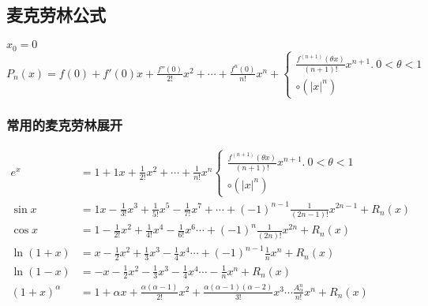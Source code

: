 \subsection{麦克劳林公式}
\begin{center}
    $x_0=0$\\
    $P_n(x)= f(0)+f'(0)x+\frac{f''(0)}{2!}x^2+\cdots+\frac{f^n(0)}{n!}x^n+\begin{cases}
        \frac{f^{(n+1)}(\theta x)}{(n+1)!}x^{n+1}.\ 0<\theta<1\\
        \circ(\left|x\right|^n)
    \end{cases}$
\end{center}
\subsubsection{常用的麦克劳林展开}
\begin{displaymath}
    \begin{split}
        e^x&=1+1x+\frac{1}{2!}x^2+\cdots+\frac{1}{n!}x^n\begin{cases}
        \frac{f^{(n+1)}(\theta x)}{(n+1)!}x^{n+1}.\ 0<\theta<1\\
        \circ(\left|x\right|^n)\end{cases}\\
    \sin x&=1x-\frac{1}{3!}x^3+\frac{1}{5!}x^5-\frac{1}{7!}x^7+\cdots+(-1)^{n-1}\frac{1}{(2n-1)!}x^{2n-1}+R_n(x)\\
    \cos x&=1-\frac{1}{2!}x^2+\frac{1}{4!}x^4-\frac{1}{6!}x^6\cdots+(-1)^{n}\frac{1}{(2n)!}x^{2n}+R_n(x)\\
    \ln(1+x)&=x-\frac{1}{2}x^2+\frac{1}{3}x^3-\frac{1}{4}x^4\cdots+(-1)^{n-1}\frac{1}{n}x^{n}+R_n(x)\\
        \ln(1-x)&=-x-\frac{1}{2}x^2-\frac{1}{3}x^3-\frac{1}{4}x^4\cdots-\frac{1}{n}x^{n}+R_n(x)\\
    (1+x)^\alpha&=1+\alpha x+\frac{\alpha(\alpha-1)}{2!}x^2+\frac{\alpha(\alpha-1)(\alpha-2)}{3!}x^3\cdots\frac{A_\alpha^n}{n!}x^n+R_n(x)
    \end{split}
\end{displaymath}



